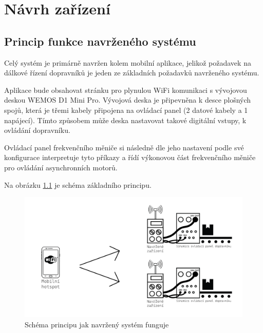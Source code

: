 \chapter{Návrh zařízení}
\section{Princip funkce navrženého systému}\label{sec:PopisFunkceSystemu}

Celý systém je primárně navržen kolem mobilní aplikace, jelikož požadavek na dálkové řízení dopravníků je jeden ze základních požadavků navrženého systému.

Aplikace bude obsahovat stránku pro plynulou WiFi komunikaci s vývojovou deskou WEMOS D1 Mini Pro. Vývojová deska je připevněna k desce plošných spojů, která je třemi kabely připojena na ovládací panel (2 datové kabely a 1 napájecí). Tímto způsobem může deska nastavovat takové digitální vstupy, k ovládání dopravníku.

Ovládací panel frekvenčního měniče si následně dle jeho nastavení podle své konfigurace interpretuje tyto příkazy a řídí výkonovou část frekvenčního měniče pro ovládání asynchronních motorů.

Na obrázku \ref{fig:PrincipFunkceZarizeni} je schéma základního principu.

\begin{figure}[hptb]
	\centering
	\includegraphics[width=1\linewidth]{images/FunkcniSchema_DvaOvladace.png}
	\caption{Schéma principu jak navržený systém funguje}
	\label{fig:PrincipFunkceZarizeni}
\end{figure}

